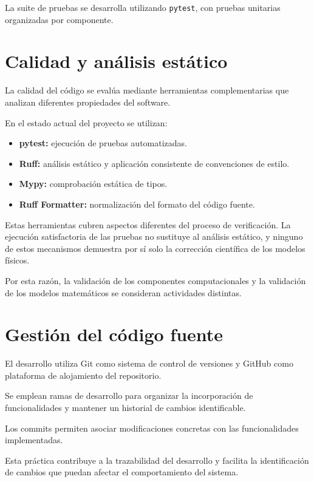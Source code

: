 La suite de pruebas se desarrolla utilizando
\texttt{pytest}, con pruebas unitarias organizadas
por componente.

\section{Calidad y análisis estático}

La calidad del código se evalúa mediante herramientas
complementarias que analizan diferentes propiedades
del software.

En el estado actual del proyecto se utilizan:

\begin{itemize}
    \item \textbf{pytest:} ejecución de pruebas automatizadas.
    \item \textbf{Ruff:} análisis estático y aplicación
    consistente de convenciones de estilo.
    \item \textbf{Mypy:} comprobación estática de tipos.
    \item \textbf{Ruff Formatter:} normalización del formato
    del código fuente.
\end{itemize}

Estas herramientas cubren aspectos diferentes
del proceso de verificación. La ejecución satisfactoria
de las pruebas no sustituye al análisis estático,
y ninguno de estos mecanismos demuestra por sí solo
la corrección científica de los modelos físicos.

Por esta razón, la validación de los componentes
computacionales y la validación de los modelos matemáticos
se consideran actividades distintas.

\section{Gestión del código fuente}

El desarrollo utiliza Git como sistema de control de versiones
y GitHub como plataforma de alojamiento del repositorio.

Se emplean ramas de desarrollo para organizar la
incorporación de funcionalidades y mantener un historial
de cambios identificable.

Los commits permiten asociar modificaciones concretas
con las funcionalidades implementadas.

Esta práctica contribuye a la trazabilidad del desarrollo
y facilita la identificación de cambios que puedan afectar
el comportamiento del sistema.

